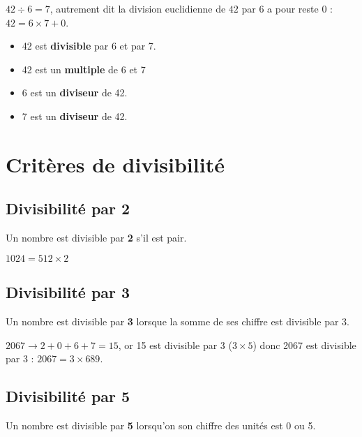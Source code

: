 \documentclass[a4paper,dvipsnames]{article}
\begin{document}
\begin{Ex}
\(42\div6=7\), autrement dit la division euclidienne de $42$ par $6$ a pour reste $0$ : \(42=6\times7+0\).\\

\begin{itemize}
    \item 42 est \textbf{divisible} par 6 et par 7.
    \item 42 est un \textbf{multiple} de 6 et 7
    \item 6 est un \textbf{diviseur} de 42.
    \item 7 est un \textbf{diviseur} de 42.
\end{itemize}
\end{Ex} 

\section{Critères de divisibilité}

\subsection{Divisibilité par 2}

\begin{Pp}
Un nombre est divisible par \textbf{2} s'il est pair.
\end{Pp}

\begin{Ex}
\(1024 = 512\times2\)
\end{Ex} 

\subsection{Divisibilité par 3}

\begin{Pp}
Un nombre est divisible par \textbf{3} lorsque la somme de ses chiffre est divisible par 3.
\end{Pp}

\begin{Ex}
\(2067 \rightarrow 2+0+6+7=15\), or 15 est divisible par 3 (\(3\times5\)) donc 2067 est divisible par 3 : \(2067=3\times689\).
\end{Ex}  

\subsection{Divisibilité par 5}

\begin{Pp}
Un nombre est divisible par \textbf{5} lorsqu'on son chiffre des unités est 0 ou 5.
\end{Pp} 
\end{document}
